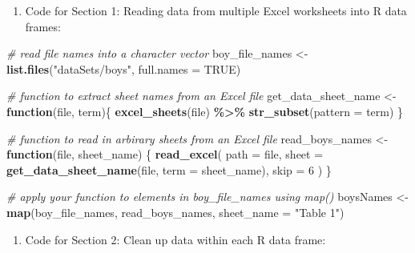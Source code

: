 \documentclass[
]{book}
\newenvironment{Shaded}{\begin{snugshade}}{\end{snugshade}}
\newcommand{\CommentTok}[1]{\textcolor[rgb]{0.56,0.35,0.01}{\textit{#1}}}
\newcommand{\ControlFlowTok}[1]{\textcolor[rgb]{0.13,0.29,0.53}{\textbf{#1}}}
\newcommand{\DataTypeTok}[1]{\textcolor[rgb]{0.13,0.29,0.53}{#1}}
\newcommand{\DecValTok}[1]{\textcolor[rgb]{0.00,0.00,0.81}{#1}}
\newcommand{\KeywordTok}[1]{\textcolor[rgb]{0.13,0.29,0.53}{\textbf{#1}}}
\newcommand{\NormalTok}[1]{#1}
\newcommand{\OperatorTok}[1]{\textcolor[rgb]{0.81,0.36,0.00}{\textbf{#1}}}
\newcommand{\OtherTok}[1]{\textcolor[rgb]{0.56,0.35,0.01}{#1}}
\newcommand{\StringTok}[1]{\textcolor[rgb]{0.31,0.60,0.02}{#1}}
\providecommand{\tightlist}{%
  \setlength{\itemsep}{0pt}\setlength{\parskip}{0pt}}
\begin{document}
\begin{enumerate}
\def\labelenumi{\arabic{enumi}.}
\tightlist
\item
  Code for Section 1: Reading data from multiple Excel worksheets into R data frames:
\end{enumerate}

\begin{Shaded}
\begin{Highlighting}[]
\CommentTok{\# read file names into a character vector}
\NormalTok{boy\_file\_names \textless{}{-}}\StringTok{ }\KeywordTok{list.files}\NormalTok{(}\StringTok{"dataSets/boys"}\NormalTok{, }\DataTypeTok{full.names =} \OtherTok{TRUE}\NormalTok{)}

\CommentTok{\# function to extract sheet names from an Excel file}
\NormalTok{get\_data\_sheet\_name \textless{}{-}}\StringTok{ }\ControlFlowTok{function}\NormalTok{(file, term)\{}
  \KeywordTok{excel\_sheets}\NormalTok{(file) }\OperatorTok{\%\textgreater{}\%}\StringTok{ }\KeywordTok{str\_subset}\NormalTok{(}\DataTypeTok{pattern =}\NormalTok{ term)}
\NormalTok{\}}

\CommentTok{\# function to read in arbirary sheets from an Excel file}
\NormalTok{read\_boys\_names \textless{}{-}}\StringTok{ }\ControlFlowTok{function}\NormalTok{(file, sheet\_name) \{}
  \KeywordTok{read\_excel}\NormalTok{(}
    \DataTypeTok{path =}\NormalTok{ file,}
    \DataTypeTok{sheet =} \KeywordTok{get\_data\_sheet\_name}\NormalTok{(file, }\DataTypeTok{term =}\NormalTok{ sheet\_name),}
    \DataTypeTok{skip =} \DecValTok{6}
\NormalTok{  )}
\NormalTok{\}}

\CommentTok{\# apply your function to elements in \textasciigrave{}boy\_file\_names\textasciigrave{} using \textasciigrave{}map()\textasciigrave{}}
\NormalTok{boysNames \textless{}{-}}\StringTok{ }\KeywordTok{map}\NormalTok{(boy\_file\_names, read\_boys\_names, }\DataTypeTok{sheet\_name =} \StringTok{"Table 1"}\NormalTok{)}
\end{Highlighting}
\end{Shaded}

\begin{enumerate}
\def\labelenumi{\arabic{enumi}.}
\setcounter{enumi}{1}
\tightlist
\item
  Code for Section 2: Clean up data within each R data frame:
\end{enumerate}
\end{document}
